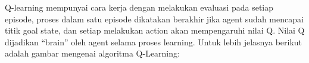 Q-learning mempunyai cara kerja dengan melakukan evaluasi pada setiap episode, proses dalam satu episode dikatakan berakhir jika agent sudah mencapai titik goal state, dan setiap melakukan action akan mempengaruhi nilai Q. Nilai Q dijadikan “brain” oleh agent selama proses learning. Untuk lebih jelasnya berikut adalah gambar mengenai algoritma Q-Learning:






